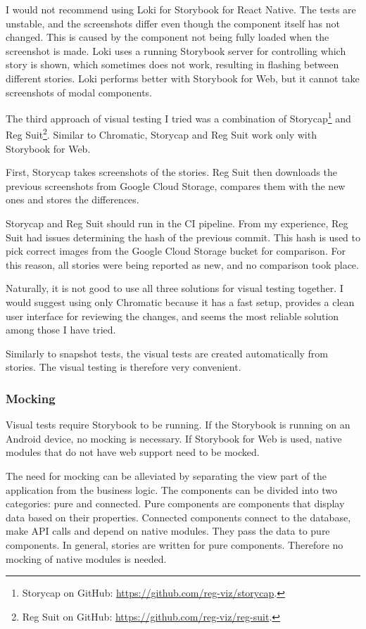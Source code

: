 \documentclass[
  digital, %
  table,   %
  oneside, %
  lof,     %
  lot,     %
]{fithesis3}
\begin{document}
I would not recommend using Loki for Storybook for React Native. The tests are unstable, and the screenshots differ even though the component itself has not changed. This is caused by the component not being fully loaded when the screenshot is made. Loki uses a running Storybook server for controlling which story is shown, which sometimes does not work, resulting in flashing between different stories.
Loki performs better with Storybook for Web, but it cannot take screenshots of modal components.

The third approach of visual testing I tried was a combination of Storycap\footnote{Storycap on GitHub: \url{https://github.com/reg-viz/storycap}.} and Reg Suit\footnote{Reg Suit on GitHub: \url{https://github.com/reg-viz/reg-suit}.}. Similar to Chromatic, Storycap and Reg Suit work only with Storybook for Web.

First, Storycap takes screenshots of the stories. Reg Suit then downloads the previous screenshots from Google Cloud Storage, compares them with the new ones and stores the differences. 

Storycap and Reg Suit should run in the CI pipeline. From my experience, Reg Suit had issues determining the hash of the previous commit. This hash is used to pick correct images from the Google Cloud Storage bucket for comparison. For this reason, all stories were being reported as new, and no comparison took place.

Naturally, it is not good to use all three solutions for visual testing together. I would suggest using only Chromatic because it has a fast setup, provides a clean user interface for reviewing the changes, and seems the most reliable solution among those I have tried.

Similarly to snapshot tests, the visual tests are created automatically from stories. The visual testing is therefore very convenient.

\subsubsection{Mocking}
Visual tests require Storybook to be running. If the Storybook is running on an Android device, no mocking is necessary. If Storybook for Web is used, native modules that do not have web support need to be mocked.

The need for mocking can be alleviated by separating the view part of the application from the business logic.
The components can be divided into two categories: pure and connected. Pure components are components that display data based on their properties. Connected components connect to the database, make API calls and depend on native modules. They pass the data to pure components. In general, stories are written for pure components. Therefore no mocking of native modules is needed.
\end{document}
